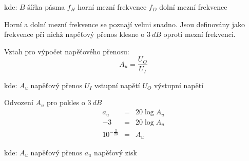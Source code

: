 			\hspace*{2cm}kde:\newline    
  			\hspace*{4cm}$B$ \dotfill šířka pásma\hspace*{4cm}\newline
	  		\hspace*{4cm}$f_H$ \dotfill horní mezní frekvence\hspace*{4cm}\newline
	  		\hspace*{4cm}$f_D$ \dotfill dolní mezní frekvence\hspace*{4cm}\newline
  							
			Horní a dolní mezní frekvence se poznají velmi snadno. Jsou definovány jako frekvence při nichž napěťový přenos klesne o $3~dB$ oproti mezní frekvenci.
			
			Vztah pro výpočet napěťového přenosu:
			\begin{equation}
  				A_u = \dfrac{U_O}{U_I}
  			\end{equation}		
		
			\hspace*{2cm}kde:\newline    
  			\hspace*{4cm}$A_u$ \dotfill napěťový přenos\hspace*{4cm}\newline
	  		\hspace*{4cm}$U_I$ \dotfill vstupní napětí\hspace*{4cm}\newline
	  		\hspace*{4cm}$U_O$ \dotfill výstupní napětí\hspace*{4cm}\newline
	  		
	  		Odvození $A_u$ pro pokles o $3~dB$
	  		\begin{eqnarray}
      			a_u &=& 20\log A_u \nonumber\\
      			-3 &=& 20\log A_u \nonumber\\       
      			10^{-\frac{3}{20}} &=& A_u
    		\end{eqnarray}
    		
    		\hspace*{2cm}kde:\newline    
  			\hspace*{4cm}$A_u$ \dotfill napěťový přenos\hspace*{4cm}\newline
	  		\hspace*{4cm}$a_u$ \dotfill napěťový zisk\hspace*{4cm}\newline
  
  


